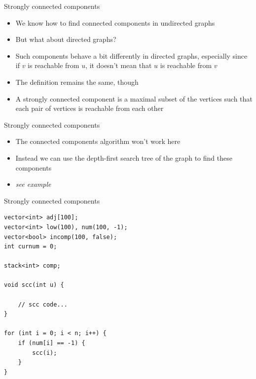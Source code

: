\documentclass{beamer}
\begin{document}
\begin{frame}[plain]{Strongly connected components}
    \vspace{10pt}
    \begin{itemize}
        \item We know how to find connected components in undirected graphs
        \item But what about directed graphs?
        \vspace{10pt}
        \item Such components behave a bit differently in directed graphs, especially since if $v$ is reachable from $u$, it doesn't mean that $u$ is reachable from $v$
        \vspace{10pt}
        \item The definition remains the same, though
        \item A strongly connected component is a maximal subset of the vertices such that each pair of vertices is reachable from each other
    \end{itemize}
\end{frame}

\begin{frame}[plain]{Strongly connected components}
    \vspace{40pt}
    \begin{itemize}
        \item The connected components algorithm won't work here
        \vspace{10pt}
        \item Instead we can use the depth-first search tree of the graph to find these components
        \vspace{10pt}
        \item \textit{see example}
    \end{itemize}
\end{frame}

\begin{frame}{Strongly connected components}
    \begin{verbatim}
vector<int> adj[100];
vector<int> low(100), num(100, -1);
vector<bool> incomp(100, false);
int curnum = 0;

stack<int> comp;

void scc(int u) {

    // scc code...
}

for (int i = 0; i < n; i++) {
    if (num[i] == -1) {
        scc(i);
    }
}
    \end{verbatim}
\end{frame}
\end{document}
